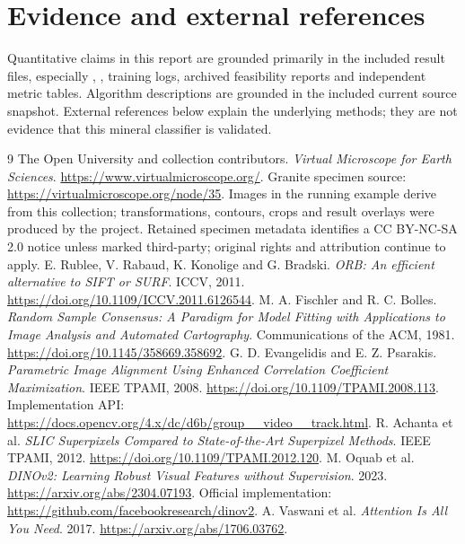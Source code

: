 \clearpage
\section{Evidence and external references}
Quantitative claims in this report are grounded primarily in the included result files, especially , , training logs, archived feasibility reports and independent metric tables. Algorithm descriptions are grounded in the included current source snapshot. External references below explain the underlying methods; they are not evidence that this mineral classifier is validated.

\begin{thebibliography}{9}
 The Open University and collection contributors. \emph{Virtual Microscope for Earth Sciences}. \url{https://www.virtualmicroscope.org/}. Granite specimen source: \url{https://virtualmicroscope.org/node/35}. Images in the running example derive from this collection; transformations, contours, crops and result overlays were produced by the project. Retained specimen metadata identifies a CC BY-NC-SA 2.0 notice unless marked third-party; original rights and attribution continue to apply.
 E. Rublee, V. Rabaud, K. Konolige and G. Bradski. \emph{ORB: An efficient alternative to SIFT or SURF}. ICCV, 2011. \url{https://doi.org/10.1109/ICCV.2011.6126544}.
 M. A. Fischler and R. C. Bolles. \emph{Random Sample Consensus: A Paradigm for Model Fitting with Applications to Image Analysis and Automated Cartography}. Communications of the ACM, 1981. \url{https://doi.org/10.1145/358669.358692}.
 G. D. Evangelidis and E. Z. Psarakis. \emph{Parametric Image Alignment Using Enhanced Correlation Coefficient Maximization}. IEEE TPAMI, 2008. \url{https://doi.org/10.1109/TPAMI.2008.113}. Implementation API: \url{https://docs.opencv.org/4.x/dc/d6b/group__video__track.html}.
 R. Achanta et al. \emph{SLIC Superpixels Compared to State-of-the-Art Superpixel Methods}. IEEE TPAMI, 2012. \url{https://doi.org/10.1109/TPAMI.2012.120}.
 M. Oquab et al. \emph{DINOv2: Learning Robust Visual Features without Supervision}. 2023. \url{https://arxiv.org/abs/2304.07193}. Official implementation: \url{https://github.com/facebookresearch/dinov2}.
 A. Vaswani et al. \emph{Attention Is All You Need}. 2017. \url{https://arxiv.org/abs/1706.03762}.
\end{thebibliography}
